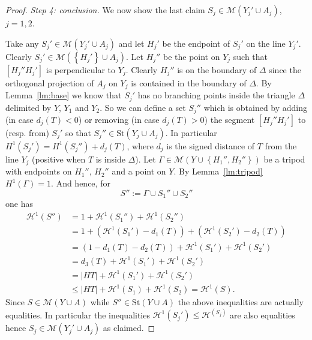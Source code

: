 \documentclass{article}
\renewcommand{\H}{\mathcal H}
\newcommand{\abs}[1]{\left\vert #1 \right\vert}
\newcommand{\ENCLOSE}[1]{\left\{#1\right\}}
\newcommand{\St}{\mathrm{St}}
\newcommand{\M}{\mathcal{M}}
\renewcommand{\H}{\mathcal{H}}
\theoremstyle{definition}
\theoremstyle{remark}
\begin{document}
\begin{proof}
  \emph{Step 4: conclusion.}
  We now show the last claim $S_j \in \M(Y_j'\cup A_j)$, $j=1,2$.

  Take any $S_j'\in \M(Y_j'\cup A_j)$ and let $H_j'$ be the 
  endpoint of $S_j'$ on the line $Y_j'$. 
  Clearly $S_j'\in \M(\ENCLOSE{H_j'}\cup A_j)$.
  Let $H_j''$ be the point on $Y_j$ such that $[H_j'' H_j']$ is perpendicular
  to $Y_j$. 
  Clearly $H_j''$ is on the boundary of $\Delta$ since the orthogonal 
  projection of $A_j$ on $Y_j$ is contained in the boundary of $\Delta$.
  By Lemma~\ref{lm:base} we know that $S_j'$ has no branching points
  inside the triangle $\Delta$ delimited by $Y$, $Y_1$ and $Y_2$.
  So we can define a set $S_j''$ which is obtained by adding
  (in case $d_j(T)<0$)
  or removing (in case $d_j(T)>0$)
  the segment $[H_j'' H_j']$ to (resp. from) $S_j'$ 
  so that $S_j''\in \St(Y_j\cup A_j)$.
  In particular $H^1(S_j') = H^1(S_j'') + d_j(T)$,
  where $d_j$ is the signed distance of $T$ from the line $Y_j$ (positive 
  when $T$ is inside $\Delta$).
  Let $\Gamma\in \M(Y\cup\ENCLOSE{H_1'',H_2''})$ 
  be a tripod with endpoints on $H_1''$, $H_2''$ and a 
  point on $Y$. 
  By Lemma~\ref{lm:tripod} $H^1(\Gamma) = 1$.
  And hence, for 
  \[
   S'' := \Gamma \cup S_1'' \cup S_2''  
  \]
  one has 
  \begin{align*}
    \H^1(S'')
    &= 1 + \H^1(S_1'') + \H^1(S_2'') \\
    &= 1 + (\H^1(S_1') - d_1(T)) + (\H^1(S_2') - d_2(T)) \\
    &= (1-d_1(T) - d_2(T)) + \H^1(S_1') + \H^1(S_2') \\
    &= d_3(T) + \H^1(S_1') + \H^1(S_2') \\
    &= \abs{HT} + \H^1(S_1') + \H^1(S_2') \\
    &\le \abs{HT} + \H^1(S_1) + \H^1(S_2)
    = \H^1(S).
  \end{align*}
  Since $S\in \M(Y\cup A)$ while $S''\in \St(Y\cup A)$ the above 
  inequalities are actually equalities.
  In particular the inequalities $\H^1(S_j') \le \H^(S_j)$ are 
  also equalities hence $S_j\in \M(Y_j'\cup A_j)$ as claimed.
\end{proof}
\end{document}
